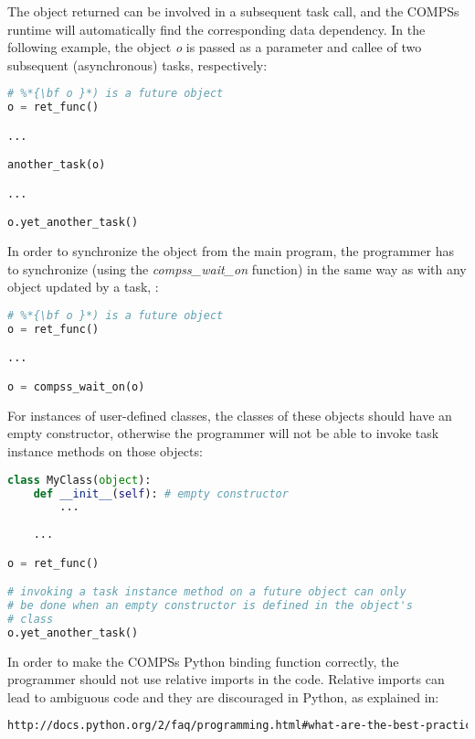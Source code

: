 The object returned can be involved in a subsequent task call, and the COMPSs runtime will automatically 
find the corresponding data dependency. In the following example, the object \textit{o} is passed as a parameter 
and callee of two subsequent (asynchronous) tasks, respectively:

\begin{lstlisting}[language=python]
# %*{\bf o }*) is a future object
o = ret_func()

...

another_task(o)

...

o.yet_another_task()
\end{lstlisting}

In order to synchronize the object from the main program, the programmer has to synchronize (using the \textit{compss\_wait\_on} function) in the same way 
as with any object updated by a task, :

\begin{lstlisting}[language=python]
# %*{\bf o }*) is a future object
o = ret_func()

...

o = compss_wait_on(o)
\end{lstlisting}
                         

For instances of user-defined classes, the classes of these objects 
should have an empty constructor, otherwise the programmer will not be able to invoke task instance 
methods on those objects:
                                   
\begin{lstlisting}[language=python]
class MyClass(object):
    def __init__(self): # empty constructor
        ...
        
    ...

o = ret_func()

# invoking a task instance method on a future object can only
# be done when an empty constructor is defined in the object's
# class
o.yet_another_task()
\end{lstlisting}

In order to make the COMPSs Python binding function correctly, the programmer should not use relative imports 
in the code. Relative imports can lead to ambiguous code and they are discouraged in Python, as explained in:

\begin{lstlisting}[language=html]
http://docs.python.org/2/faq/programming.html#what-are-the-best-practices-for-using-import-in-a-module
\end{lstlisting}


